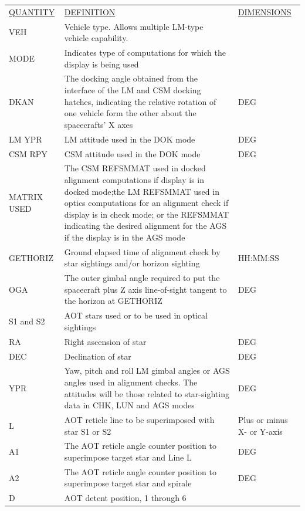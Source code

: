 \documentclass[11pt]{article} %
\begin{document}
\begin{center}
\begin{tabular}{ L{2.4cm} L{7.1cm} L{3cm} }
\underline{QUANTITY} & \underline{DEFINITION} & \underline{DIMENSIONS} \\
VEH &Vehicle type. Allows multiple LM-type vehicle capability.&\\
MODE&Indicates type of computations for which the display is being used&\\
DKAN&The docking angle obtained from the interface of the LM and CSM docking hatches, indicating the relative rotation of one vehicle form the other about the spacecrafts' X axes&DEG\\
LM YPR&LM attitude used in the DOK mode&DEG\\
CSM RPY&CSM attitude used in the DOK mode&DEG\\
MATRIX USED&The CSM REFSMMAT used in docked alignment computations if display is in docked mode;the LM REFSMMAT used in optics computations for an alignment check if display is in check mode; or the REFSMMAT indicating the desired alignment for the AGS if the display is in the AGS mode&\\
GETHORIZ&Ground elapsed time of alignment check by star sightings and/or horizon sighting&HH:MM:SS\\
OGA&The outer gimbal angle required to put the spacecraft plus Z axis line-of-sight tangent to the horizon at GETHORIZ&DEG\\
S1 and S2&AOT stars used or to be used in optical sightings&\\
RA&Right ascension of star&DEG\\
DEC&Declination of star&DEG\\
YPR&Yaw, pitch and roll LM gimbal angles or AGS angles used in alignment checks. The attitudes will be those related to star-sighting data in CHK, LUN and AGS modes&DEG\\
L&AOT reticle line to be superimposed with star S1 or S2&Plus or minus X- or Y-axis\\
A1&The AOT reticle angle counter position to superimpose target star and Line L&DEG\\
A2&The AOT reticle angle counter position to superimpose target star and spirale&DEG\\
D&AOT detent position, 1 through 6&\\
\end{tabular}
\end{center}

\newpage
\end{document}
